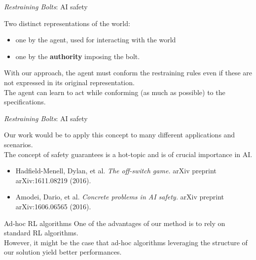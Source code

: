 \documentclass{beamer}
\begin{document}
\begin{frame}{\emph{Restraining Bolts}: AI safety}
	
	Two distinct representations of the world:
	\begin{itemize}
		\item one by the agent, used for interacting with the world
		\item one by the \textbf{authority} imposing the bolt.
	\end{itemize}
	
	\vspace{0.3cm}
	With our approach, the agent must conform the restraining rules even if these are not expressed in its original	representation.\\
	
	\vspace{0.3cm}
	The agent can learn to act while conforming (as much as possible) to the \LLf specifications.\\
	
	
	
\end{frame}

\begin{frame}{\emph{Restraining Bolts}: AI safety}
	
	Our work would be to apply this concept to many different applications and scenarios.\\
	
	\vspace{0.3cm}
	The concept of safety guarantees is a hot-topic and is of crucial importance in AI.
	\begin{itemize}
		\item Hadfield-Menell, Dylan, et al. \emph{The off-switch game.} arXiv preprint arXiv:1611.08219 (2016).
		\item Amodei, Dario, et al. \emph{Concrete problems in AI safety.} arXiv preprint arXiv:1606.06565 (2016).
	\end{itemize}
\end{frame}

\begin{frame}{Ad-hoc RL algorithms}
	One of the advantages of our method is to rely on standard RL algorithms.\\
	
	\vspace{0.5cm}
	However, it might be the case that ad-hoc algorithms leveraging the structure of our solution yield better performances.
\end{frame}
\end{document}
